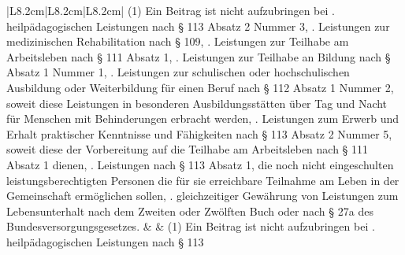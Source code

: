 \documentclass[10pt,a4paper,landscape]{article}
\begin{document}
\begin{longtable}{|L{8.2cm}|L{8.2cm}|L{8.2cm}|}
(1) Ein Beitrag ist nicht aufzubringen bei  .  \newline heilpädagogischen Leistungen nach \S{} 113  \newline Absatz 2 Nummer 3,  .  \newline Leistungen zur medizinischen  \newline Rehabilitation nach \S{} 109,  .  \newline Leistungen zur Teilhabe am Arbeitsleben  \newline nach \S{} 111 Absatz 1,  .  \newline Leistungen zur Teilhabe an Bildung nach \S{}   Absatz 1 Nummer 1,  .  \newline Leistungen zur schulischen oder  \newline hochschulischen Ausbildung oder  \newline Weiterbildung für einen Beruf nach \S{} 112  \newline Absatz 1 Nummer 2, soweit diese  \newline Leistungen in besonderen  \newline Ausbildungsstätten über Tag und Nacht für  \newline Menschen mit Behinderungen erbracht  \newline werden,  .  \newline Leistungen zum Erwerb und Erhalt  \newline praktischer Kenntnisse und Fähigkeiten  \newline nach \S{} 113 Absatz 2 Nummer 5, soweit  \newline diese der Vorbereitung auf die Teilhabe am  \newline Arbeitsleben nach \S{} 111 Absatz 1 dienen,  .  \newline \textcolor{diffred}{Leistungen nach \S{} 113 Absatz 1, die noch  \newline nicht eingeschulten leistungsberechtigten  \newline Personen die für sie erreichbare Teilnahme  \newline am Leben in der Gemeinschaft  \newline ermöglichen sollen,  .}  \newline gleichzeitiger Gewährung von Leistungen  \newline zum Lebensunterhalt nach dem Zweiten  \newline oder Zwölften Buch oder nach \S{} 27a des  \newline Bundesversorgungsgesetzes. &  & (1) Ein Beitrag ist nicht aufzubringen bei  .  \newline heilpädagogischen Leistungen nach \S{} 113  \newline 
\end{longtable}
\end{document}
